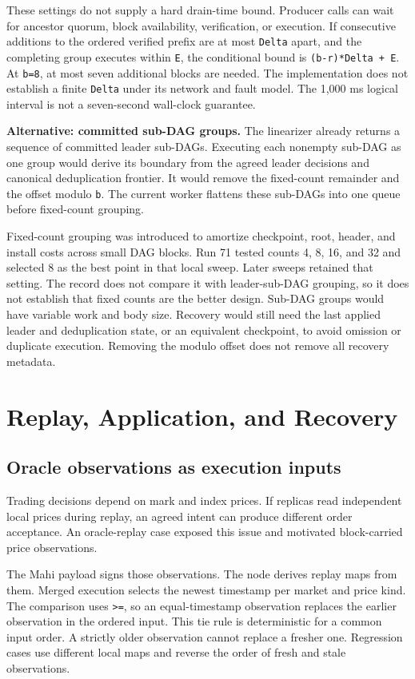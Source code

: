 \documentclass[11pt]{article}
\begin{document}
These settings do not supply a hard drain-time bound. Producer calls can wait for ancestor quorum, block availability, verification, or execution. If consecutive additions to the ordered verified prefix are at most \texttt{Delta} apart, and the completing group executes within \texttt{E}, the conditional bound is \texttt{(b-r)*Delta + E}. At \texttt{b=8}, at most seven additional blocks are needed. The implementation does not establish a finite \texttt{Delta} under its network and fault model. The 1,000 ms logical interval is not a seven-second wall-clock guarantee.

\textbf{Alternative: committed sub-DAG groups.} The linearizer already returns a sequence of committed leader sub-DAGs. Executing each nonempty sub-DAG as one group would derive its boundary from the agreed leader decisions and canonical deduplication frontier. It would remove the fixed-count remainder and the offset modulo \texttt{b}. The current worker flattens these sub-DAGs into one queue before fixed-count grouping. \cite{R12}

Fixed-count grouping was introduced to amortize checkpoint, root, header, and install costs across small DAG blocks. Run 71 tested counts 4, 8, 16, and 32 and selected 8 as the best point in that local sweep. Later sweeps retained that setting. The record does not compare it with leader-sub-DAG grouping, so it does not establish that fixed counts are the better design. Sub-DAG groups would have variable work and body size. Recovery would still need the last applied leader and deduplication state, or an equivalent checkpoint, to avoid omission or duplicate execution. Removing the modulo offset does not remove all recovery metadata. \cite{R12,R13}

\section{Replay, Application, and Recovery}
\subsection{Oracle observations as execution inputs}
Trading decisions depend on mark and index prices. If replicas read independent local prices during replay, an agreed intent can produce different order acceptance. An oracle-replay case exposed this issue and motivated block-carried price observations. \cite{R16}

The Mahi payload signs those observations. The node derives replay maps from them. Merged execution selects the newest timestamp per market and price kind. The comparison uses \texttt{>=}, so an equal-timestamp observation replaces the earlier observation in the ordered input. This tie rule is deterministic for a common input order. A strictly older observation cannot replace a fresher one. Regression cases use different local maps and reverse the order of fresh and stale observations. \cite{R12,R16}
\end{document}
